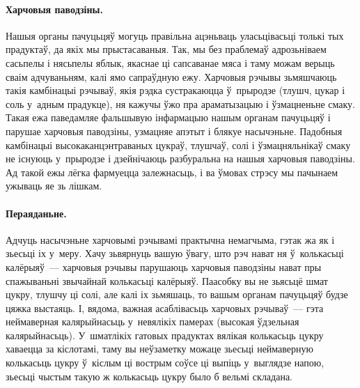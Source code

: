 \paragraph{Харчовыя паводзіны.}
Нашыя органы пачуцьцяў могуць правільна ацэньваць уласьцівасьці толькі тых прадуктаў, да якіх мы прыстасаваныя. Так, мы без праблемаў адрозьніваем сасьпелы і нясьпелы яблык, якаснае ці сапсаванае мяса і таму можам верыць сваім адчуваньням, калі ямо сапраўдную ежу. Харчовыя рэчывы зьмяшчаюць такія камбінацыі рэчываў, якія рэдка сустракаюцца ў~прыродзе (тлушч, цукар і соль у~адным прадукце), ня кажучы ўжо пра араматызацыю і ўзмацненьне смаку. Такая ежа паведамляе фальшывую інфармацыю нашым органам пачуцьцяў і парушае харчовыя паводзіны, узмацняе апэтыт і блякуе насычэньне. Падобныя камбінацыі высокаканцэнтраваных цукраў, тлушчаў, солі і ўзмацняльнікаў смаку не існуюць у~прыродзе і дзейнічаюць разбуральна на нашыя харчовыя паводзіны. Ад такой ежы лёгка фармуецца залежнасьць, і ва ўмовах стрэсу мы пачынаем ужываць яе зь лішкам.

\paragraph{Пераяданьне.}
Адчуць насычэньне харчовымі рэчывамі практычна немагчыма, гэтак жа як і зьесьці іх у~меру. Хачу зьвярнуць вашую ўвагу, што рэч нават ня ў~колькасьці калёрыяў~--- харчовыя рэчывы парушаюць харчовыя паводзіны нават пры спажываньні звычайнай колькасьці калёрыяў. Паасобку вы не зьясьцё шмат цукру, тлушчу ці солі, але калі іх зьмяшаць, то вашым органам пачуцьцяў будзе цяжка выстаяць. І, вядома, важная асаблівасьць харчовых рэчываў~--- гэта неймаверная калярыйнасьць у~невялікіх памерах (высокая ўдзельная калярыйнасьць). У~шматлікіх гатовых прадуктах вялікая колькасьць цукру хаваецца за кіслотамі, таму вы неўзаметку можаце зьесьці неймаверную колькасьць цукру ў~кіслым ці вострым соўсе ці выпіць у~выглядзе напою, зьесьці чыстым такую ж колькасьць цукру было б вельмі складана.


